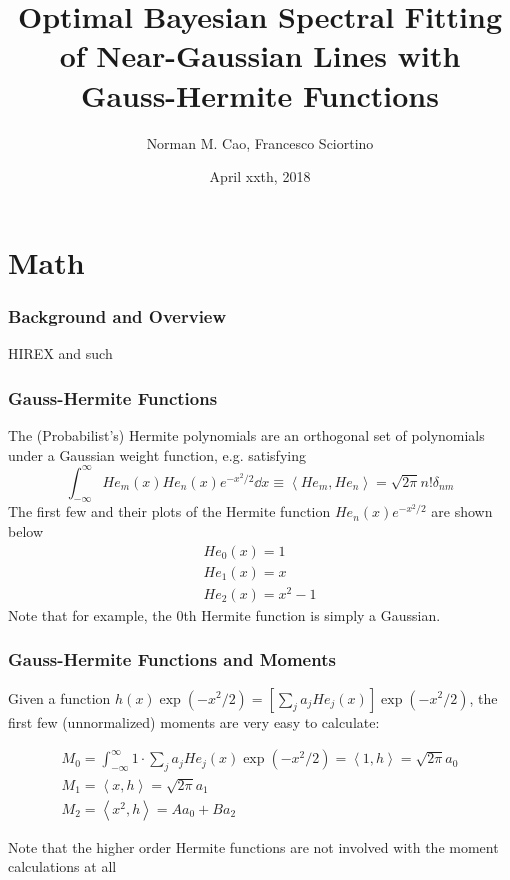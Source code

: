 \documentclass{beamer}
\begin{document}
\title[BSFC]{Optimal Bayesian Spectral Fitting of Near-Gaussian Lines with Gauss-Hermite Functions}

\author[N.M. Cao and F. Sciortino]{Norman M. Cao, Francesco Sciortino}
\date{April xxth, 2018}

\begin{frame}
	\titlepage
\end{frame}

\section{Math}

\begin{frame}
	\frametitle{Background and Overview}
	HIREX and such
\end{frame}

\begin{frame}
	\frametitle{Gauss-Hermite Functions}
	The (Probabilist's) Hermite polynomials are an orthogonal set of polynomials under a Gaussian weight function, e.g. satisfying
	\begin{equation}
	\int_{-\infty}^{\infty} He_m(x) He_n(x) e^{-x^2/2} \dd{x} \equiv \left< He_m, He_n \right> = \sqrt{2 \pi} n! \delta_{nm}
	\end{equation}
	The first few and their plots of the Hermite function \(He_n(x) e^{-x^2/2}\) are shown below
	\begin{equation}
	\begin{gathered}
	He_0(x) = 1 \\
	He_1(x) = x \\
	He_2(x) = x^2-1
	\end{gathered}
	\end{equation}
	Note that for example, the 0th Hermite function is simply a Gaussian.
\end{frame}

\begin{frame}
	\frametitle{Gauss-Hermite Functions and Moments}
	Given a function \(h(x) \exp(-x^2/2) = \left[\sum_j a_j He_j(x)\right] \exp(-x^2/2)\), the first few (unnormalized) moments are very easy to calculate:
	
	\begin{equation}
	\begin{gathered}
	M_0 = \int_{-\infty}^{\infty} 1 \cdot \sum_j a_j He_j(x) \exp(-x^2/2) = \left< 1, h \right> = \sqrt{2\pi} a_0 \\
	M_1 = \left< x, h \right> = \sqrt{2 \pi}a_1 \\
	M_2 = \left< x^2, h \right> = A a_0 + B a_2
	\end{gathered}
	\end{equation}
	
	Note that the higher order Hermite functions are not involved with the moment calculations at all
\end{frame}
\end{document}
